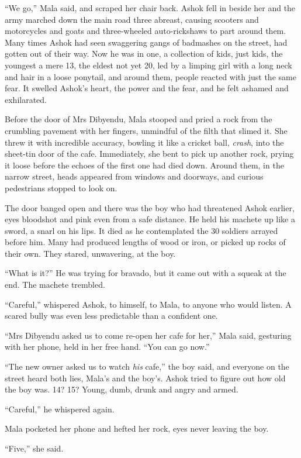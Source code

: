 ``We go,'' Mala said, and scraped her chair back. Ashok fell in
beside her and the army marched down the main road three abreast,
causing scooters and motorcycles and goats and three-wheeled
auto-rickshaws to part around them. Many times Ashok had seen
swaggering gangs of badmashes on the street, had gotten out of
their way. Now he was in one, a collection of kids, just kids, the
youngest a mere 13, the eldest not yet 20, led by a limping girl
with a long neck and hair in a loose ponytail, and around them,
people reacted with just the same fear. It swelled Ashok's heart,
the power and the fear, and he felt ashamed and exhilarated.

Before the door of Mrs Dibyendu, Mala stooped and pried a rock from
the crumbling pavement with her fingers, unmindful of the filth
that slimed it. She threw it with incredible accuracy, bowling it
like a cricket ball, \emph{crash}, into the sheet-tin door of the
cafe. Immediately, she bent to pick up another rock, prying it
loose before the echoes of the first one had died down. Around
them, in the narrow street, heads appeared from windows and
doorways, and curious pedestrians stopped to look on.

The door banged open and there was the boy who had threatened Ashok
earlier, eyes bloodshot and pink even from a safe distance. He held
his machete up like a sword, a snarl on his lips. It died as he
contemplated the 30 soldiers arrayed before him. Many had produced
lengths of wood or iron, or picked up rocks of their own. They
stared, unwavering, at the boy.

``What is it?'' He was trying for bravado, but it came out with a
squeak at the end. The machete trembled.

``Careful,'' whispered Ashok, to himself, to Mala, to anyone who
would listen. A scared bully was even less predictable than a
confident one.

``Mrs Dibyendu asked us to come re-open her cafe for her,'' Mala
said, gesturing with her phone, held in her free hand. ``You can go
now.''

``The new owner asked us to watch \emph{his} cafe,'' the boy said,
and everyone on the street heard both lies, Mala's and the boy's.
Ashok tried to figure out how old the boy was. 14? 15? Young, dumb,
drunk and angry and armed.

``Careful,'' he whispered again.

Mala pocketed her phone and hefted her rock, eyes never leaving the
boy.

``Five,'' she said.

